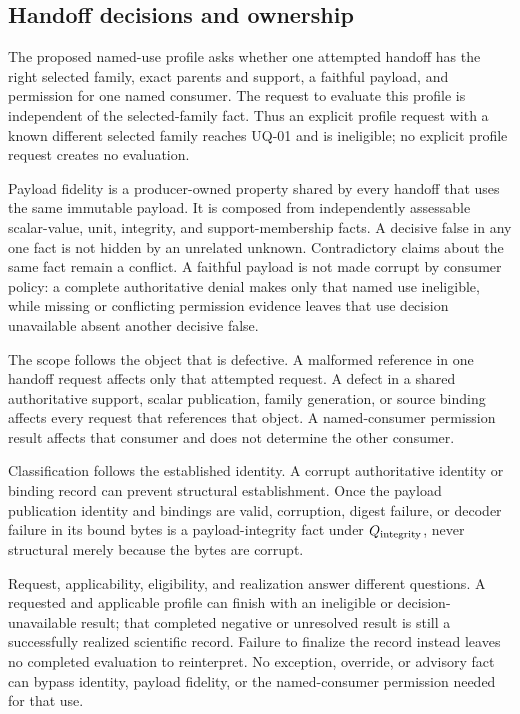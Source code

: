 \subsection{Handoff decisions and ownership}

The proposed named-use profile asks whether one attempted handoff has the
right selected family, exact parents and support, a faithful payload, and
permission for one named consumer. The request to evaluate this profile is
independent of the selected-family fact. Thus an explicit profile request with
a known different selected family reaches UQ-01 and is ineligible; no explicit
profile request creates no evaluation.

Payload fidelity is a producer-owned property shared by every handoff that
uses the same immutable payload. It is composed from independently assessable
scalar-value, unit, integrity, and support-membership facts. A decisive false
in any one fact is not hidden by an unrelated unknown. Contradictory claims
about the same fact remain a conflict. A faithful payload is not made corrupt
by consumer policy: a complete authoritative denial makes only that named use
ineligible, while missing or conflicting permission evidence leaves that use
decision unavailable absent another decisive false.

The scope follows the object that is defective. A malformed reference in one
handoff request affects only that attempted request. A defect in a shared
authoritative support, scalar publication, family generation, or source
binding affects every request that references that object. A named-consumer
permission result affects that consumer and does not determine the other
consumer.

Classification follows the established identity. A corrupt authoritative
identity or binding record can prevent structural establishment. Once the
payload publication identity and bindings are valid, corruption, digest
failure, or decoder failure in its bound bytes is a payload-integrity fact
under \(Q_{\rm integrity}\), never structural merely because the bytes are
corrupt.

Request, applicability, eligibility, and realization answer different
questions. A requested and applicable profile can finish with an ineligible
or decision-unavailable result; that completed negative or unresolved result
is still a successfully realized scientific record. Failure to finalize the
record instead leaves no completed evaluation to reinterpret. No exception,
override, or advisory fact can bypass identity, payload fidelity, or the
named-consumer permission needed for that use.

